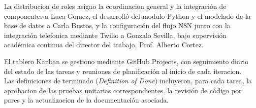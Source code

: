 La distribucion de roles asigno la coordinacion general y la integración de componentes a Luca Gomez, el desarrolló del modulo Python y el modelado de la base de datos a Carla Bustos, y la configuración del flujo N8N junto con la integración telefonica mediante Twilio a Gonzalo Sevilla, bajo supervisión académica continua del director del trabajo, Prof. Alberto Cortez.

El tablero Kanban se gestiono mediante GitHub Projects, con seguimiento diario del estado de las tareas y reuniones de planificación al inicio de cada iteracion. Las definiciones de terminado (\emph{Definition of Done}) incluyeron, para cada tarea, la aprobacion de las pruebas unitarias correspondientes, la revisión de código por pares y la actualizacion de la documentación asociada.

\newpage
